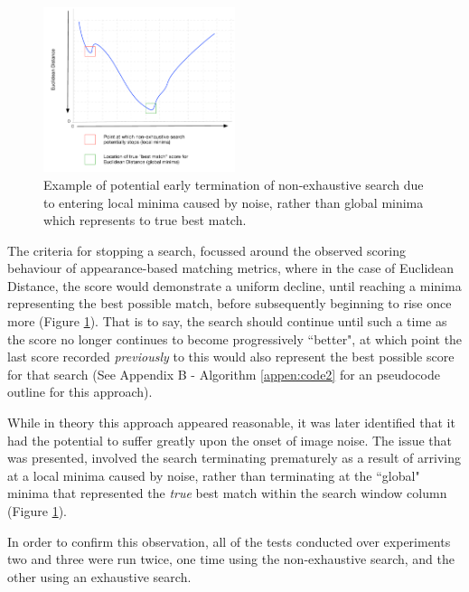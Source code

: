 \begin{figure}
\vspace{-20pt}
  \begin{center}
    \includegraphics[width=0.5\textwidth]{images/ed.pdf}
  \end{center}
  \vspace{-10pt}
  \caption{Example of potential early termination of non-exhaustive search due to entering local minima caused by noise, rather than global minima which represents to true best match.}
     \label{fig:ed}
  \vspace{-10pt}
\end{figure}

The criteria for stopping a search, focussed around the observed scoring behaviour of appearance-based matching metrics, where in the case of Euclidean Distance, the score would demonstrate a uniform decline, until reaching a minima representing the best possible match, before subsequently beginning to rise once more (Figure \ref{fig:ed}). That is to say, the search should continue until such a time as the score no longer continues to become progressively ``better", at which point the last score recorded \textit{previously} to this would also represent the best possible score for that search (See Appendix B - Algorithm \ref{appen:code2} for an pseudocode outline for this approach).

While in theory this approach appeared reasonable, it was later identified that it had the potential to suffer greatly upon the onset of image noise. The issue that was presented, involved the search terminating prematurely as a result of arriving at a local minima caused by noise, rather than terminating at the ``global" minima that represented the \textit{true} best match within the search window column (Figure \ref{fig:ed}). 

In order to confirm this observation, all of the tests conducted over experiments two and three were run twice, one time using the non-exhaustive search, and the other using an exhaustive search.

